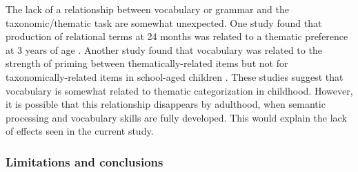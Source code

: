 \documentclass[../dissertation.tex]{subfiles}
\begin{document}
	The lack of a relationship between vocabulary or grammar and the taxonomic/thematic task are somewhat unexpected. One study found that production of relational terms at 24 months was related to a thematic preference at 3 years of age \citep{Dunham1995}. Another study found that vocabulary was related to the strength of priming between thematically-related items but not for taxonomically-related items in school-aged children \citep{Brooks2014}. These studies suggest that vocabulary is somewhat related to thematic categorization in childhood. However, it is possible that this relationship disappears by adulthood, when semantic processing and vocabulary skills are fully developed. This would explain the lack of effects seen in the current study. \par
	
\subsubsection{Limitations and conclusions}	
\end{document}
